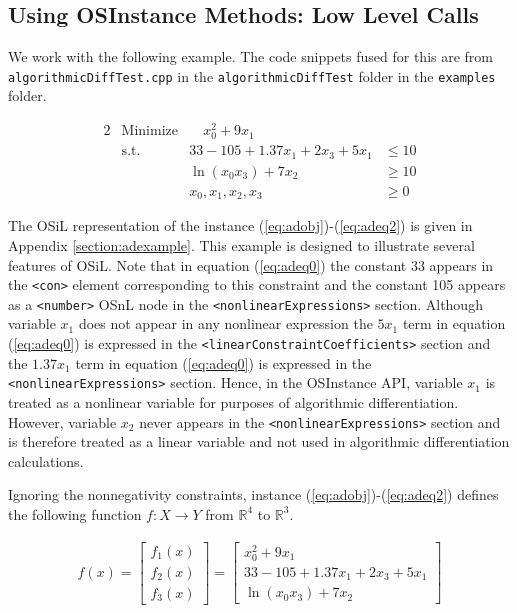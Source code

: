 \documentclass[11pt]{article}
\renewcommand{\_}{{\char"5F}}
\renewcommand{\{}{{\char"7B}}
\renewcommand{\}}{{\char"7D}}
\renewcommand{\^}{{\char"0D}}
\renewcommand{\'}{{\char"0D}}
\begin{document}
 

\subsection{Using OSInstance Methods: Low Level Calls}

We work with the  following example.  The code snippets fused for this are from {\tt algorithmicDiffTest.cpp} in the {\tt algorithmicDiffTest} folder in the {\tt examples} folder.

\begin{alignat}{2}
& \mbox{Minimize} & \quad  x_{0}^{2} + 9x_{1} \label{eq:adobj}\\
& \mbox{s.t.} & 33 - 105 + 1.37 x_{1} + 2x_{3} + 5 x_{1} &\le 10  \label{eq:adeq0}\\
& & \ln(x_{0} x_{3}) + 7x_{2} &\ge 10 \label{eq:adeq1} \\
& & x_{0}, x_{1}, x_{2}, x_{3} &\ge 0 \label{eq:adeq2}
\end{alignat}

The OSiL representation of the instance  (\ref{eq:adobj})-(\ref{eq:adeq2}) is given in Appendix \ref{section:adexample}.  This example is designed to illustrate several features of OSiL. Note that in equation (\ref{eq:adeq0}) the constant 33 appears in the {\tt <con>} element corresponding to this constraint and the constant 105 appears as a {\tt <number>} OSnL node in the {\tt <nonlinearExpressions>} section. Although variable $x_{1}$ does not appear in any nonlinear expression the $5 x_{1}$ term in equation (\ref{eq:adeq0}) is expressed in the {\tt <linearConstraintCoefficients>} section and the $1.37 x_{1}$ term in equation (\ref{eq:adeq0}) is expressed in the {\tt <nonlinearExpressions>} section.  Hence, in the OSInstance API, variable $x_{1}$ is treated as a nonlinear variable for purposes of algorithmic differentiation. However, variable $x_{2}$ never appears in the  {\tt <nonlinearExpressions>} section and is therefore treated as a linear variable and not used  in algorithmic differentiation calculations. 

Ignoring the nonnegativity constraints, instance (\ref{eq:adobj})-(\ref{eq:adeq2})  defines the following function $f:X \rightarrow Y$ from $ \mathbb{R}^{4}$ to $ \mathbb{R}^{3}.$

\begin{eqnarray}
f(x) =
\left[
\begin{array}{r}
f_{1}(x) \\
f_{2}(x) \\
f_{3}(x)
\end{array}
\right]
=
\left[
\begin{array}{r}
x_{0}^{2} + 9x_{1}  \\
33 - 105 + 1.37 x_{1} + 2x_{3} + 5 x_{1} \\
\ln(x_{0} x_{3}) + 7x_{2}
\end{array}
\right] \label{eq:definef}
\end{eqnarray}
\end{document}
